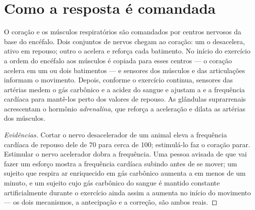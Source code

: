 \section{Como a resposta é comandada}

\begin{proposition}\label{prop:g10:heart-lungs-effort:control}
O coração e os músculos respiratórios são comandados por centros
nervosos da base do encéfalo. Dois conjuntos de nervos chegam ao
coração: um o desacelera, ativo em repouso; outro o acelera e reforça
cada batimento. No início do exercício a ordem do encéfalo aos músculos
é copiada para esses centros --- o coração acelera em um ou dois
batimentos --- e sensores dos músculos e das articulações informam o
movimento. Depois, conforme o exercício continua, sensores das artérias
medem o gás carbônico e a acidez do sangue e ajustam a  e a
frequência cardíaca para mantê-los perto dos valores de repouso. As
glândulas suprarrenais acrescentam o hormônio
\emph{adrenalina}, que reforça a aceleração e dilata
as artérias dos músculos.
\end{proposition}
\begin{proof}[Evidências]
Cortar o nervo desacelerador de um animal eleva a frequência cardíaca
de repouso dele de 70 para cerca de 100; estimulá-lo faz o coração
parar. Estimular o nervo acelerador dobra a frequência. Uma pessoa
avisada de que vai fazer um esforço mostra a frequência cardíaca
subindo antes de se mover; um sujeito que respira ar enriquecido em gás
carbônico aumenta a  em menos de um minuto, e um sujeito cujo
gás carbônico do sangue é mantido constante artificialmente durante o
exercício ainda assim a aumenta no início do movimento --- os dois
mecanismos, a antecipação e a correção, são ambos reais.
\end{proof}

